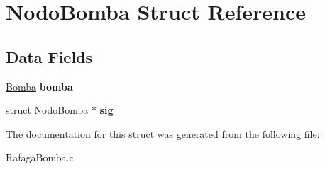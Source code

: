 \hypertarget{struct_nodo_bomba}{}\section{Nodo\+Bomba Struct Reference}
\label{struct_nodo_bomba}
\subsection*{Data Fields}
\begin{DoxyCompactItemize}
\item 
\mbox{\label{struct_nodo_bomba_a0ebf03deca724f9f7eded563bc4f3c64}} 
\mbox{\hyperlink{_bomba_8h_aa7502670a5779cfa4126e95d52b1ce8b}{Bomba}} {\bfseries bomba}
\item 
\mbox{\label{struct_nodo_bomba_a3913d6bd9308a404edd28333515b1f1e}} 
struct \mbox{\hyperlink{struct_nodo_bomba}{Nodo\+Bomba}} $\ast$ {\bfseries sig}
\end{DoxyCompactItemize}


The documentation for this struct was generated from the following file\+:\begin{DoxyCompactItemize}
\item 
Rafaga\+Bomba.\+c\end{DoxyCompactItemize}
